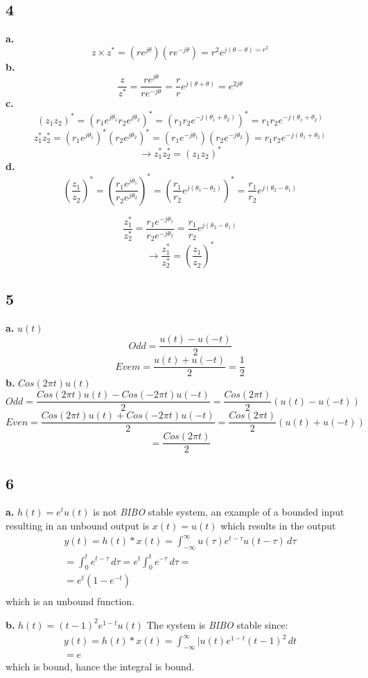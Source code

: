 \documentclass[12pt]{article}
\begin{document}
\subsection*{4}
\textbf{a.}
\[z \times z^* = (re^{j\theta})(re^{-j\theta}) = r^2 e^{j(\theta - \theta) = r^2} \]
\textbf{b.}
\[ \frac{z}{z^*} = \frac{re^{j\theta}}{re^{-j\theta}} = \frac{r}{r} e^{j (\theta + \theta)} = e^{2j\theta} \]
\textbf{c.}
\[(z_1 z_2)^* = (r_1 e^{j \theta_1} r_2 e^{j \theta_2})^* = (r_1 r_2 e^{-j(\theta_1 + \theta_2)})^* = r_1 r_2 e^{-j(\theta_1 + \theta_2)}\]
\[z_1^* z_2^* = (r_1e^{j\theta_1})^* (r_2e^{j\theta_2})^* = (r_1e^{-j\theta_1}) (r_2e^{-j\theta_2})  = r_1 r_2 e^{-j(\theta_1 + \theta_2)} \]
\[\rightarrow z_1^* z_2^* = (z_1 z_2)^*\]
\textbf{d.}
\[
(\frac{z_1}{z_2})^*  = (\frac{r_1e^{j\theta_1}}{r_2e^{j\theta_2}})^* =   (\frac{r_1}{r_2} e^{j(\theta_1 - \theta_2)})^* =     
\frac{r_1}{r_2} e^{j(\theta_2 - \theta_1)}
\]

\[
\frac{z_1^*}{z_2^*} =
\frac{r_1 e^{-j\theta_1}}{r_2 e^{-j\theta_2}} = 
\frac{r_1}{r_2} e^{j(\theta_2 - \theta_1)}
\]
\[
\rightarrow
\frac{z_1^*}{z_2^*} =(\frac{z_1}{z_2})^* 
\]

\subsection*{5}
\textbf{a.} $u(t)$
\[ Odd = \frac{u(t) - u(-t)}{2}\]
\[Evem = \frac{u(t) + u(-t)}{2} =  \frac{1}{2}\]
\textbf{b.} $Cos(2\pi t)u(t)$
\[Odd = \frac{Cos(2\pi t)u(t) - Cos(-2\pi t)u(-t)}{2} = \frac{Cos(2\pi t)}{2}(u(t) - u(-t))\]
\[Even = \frac{Cos(2\pi t)u(t) + Cos(-2\pi t)u(-t)}{2} = \frac{Cos(2\pi t)}{2}(u(t) + u(-t))\]
\[ = \frac{Cos(2\pi t)}{2}\]


\subsection*{6}
\textbf{a.} $h(t) = e^tu(t)$ is not \emph{BIBO} stable system, an example of a bounded input 
resulting in an unbound output is $x(t) = u(t)$ which results in the output
\begin{align*}
y(t) = h(t) * x(t) = 
\int_{-\infty}^{\infty} u(\tau)e^{t - \tau}u(t - \tau) \, d\tau \\
= \int_{0}^{t}e^{t - \tau} \, d\tau 
= e^t \int_{0}^{t}e^{-\tau} \, d\tau = \\
= \boxed{e^t (1 - e^{-t})}
\\
\end{align*}
which is an unbound function.

\textbf{b.} $h(t) = (t - 1)^2e^{1-t}u(t)$ The system is \emph{BIBO} stable since:
\begin{align*}
	y(t) = h(t) * x(t) = 
	\int_{-\infty}^{\infty} |u(t)e^{1 - t}(t - 1)^2 \, dt \\
	= e
\end{align*}
which is bound, hance the integral is bound.
\end{document}
